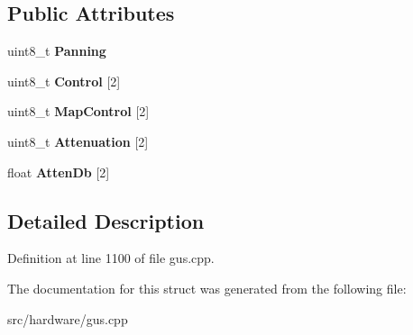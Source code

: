 \subsection*{Public Attributes}
\begin{DoxyCompactItemize}
\item 
\hypertarget{structgus__ICS2101_1_1mixcontrol_a51061e6484c9e123414be0af811b714f}{uint8\-\_\-t {\bfseries Panning}}\label{structgus__ICS2101_1_1mixcontrol_a51061e6484c9e123414be0af811b714f}

\item 
\hypertarget{structgus__ICS2101_1_1mixcontrol_abc998b7038d01a551dbc659027d54f66}{uint8\-\_\-t {\bfseries Control} \mbox{[}2\mbox{]}}\label{structgus__ICS2101_1_1mixcontrol_abc998b7038d01a551dbc659027d54f66}

\item 
\hypertarget{structgus__ICS2101_1_1mixcontrol_a916268f834849e724a87c1f6510bb964}{uint8\-\_\-t {\bfseries Map\-Control} \mbox{[}2\mbox{]}}\label{structgus__ICS2101_1_1mixcontrol_a916268f834849e724a87c1f6510bb964}

\item 
\hypertarget{structgus__ICS2101_1_1mixcontrol_afb5439928a40cd9679b7128298f92702}{uint8\-\_\-t {\bfseries Attenuation} \mbox{[}2\mbox{]}}\label{structgus__ICS2101_1_1mixcontrol_afb5439928a40cd9679b7128298f92702}

\item 
\hypertarget{structgus__ICS2101_1_1mixcontrol_afc8504acb2e1fb3afcc045e255023605}{float {\bfseries Atten\-Db} \mbox{[}2\mbox{]}}\label{structgus__ICS2101_1_1mixcontrol_afc8504acb2e1fb3afcc045e255023605}

\end{DoxyCompactItemize}


\subsection{Detailed Description}


Definition at line 1100 of file gus.\-cpp.



The documentation for this struct was generated from the following file\-:\begin{DoxyCompactItemize}
\item 
src/hardware/gus.\-cpp\end{DoxyCompactItemize}
